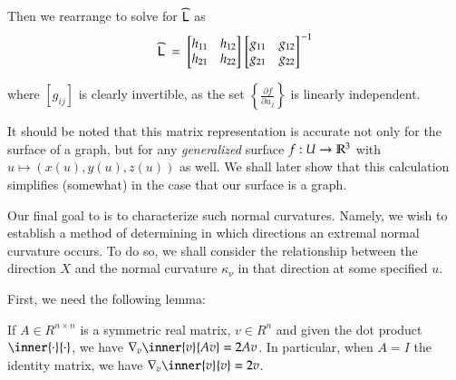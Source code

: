 		Then we rearrange to solve for $\widehat{\mathsf{L}}$ as
			\begin{equation} \label{weinmatconstruction}
			\widehat{\mathsf{L}}
			\;=\; \begin{bmatrix} h_{11} & h_{12} \\ h_{21} & h_{22} \end{bmatrix}
			\left.\begin{bmatrix} g_{11} & g_{12} \\ g_{21} & g_{22} \end{bmatrix}\right.^{-1}
			\end{equation}
		
		where $\left[ g_{ij} \right]$ is clearly invertible, as the set
		$\left\{\frac{\partial f}{\partial u_j}\right\}$ is linearly independent.
		
		It should be noted that this matrix representation is accurate not only for the surface of a graph, but for any \textit{generalized} surface
		$f: U \to \mathbb{R}^3 $ with $u \mapsto (x(u), y(u), z(u))$ as well. We shall later show that this calculation simplifies (somewhat) in the case that our surface is a graph.
		
		
		Our final goal to is to characterize such normal curvatures.
		Namely, we wish to establish a method of determining in which directions an extremal
		normal curvature occurs.
		To do so, we shall consider the relationship between the direction $X$ and the normal curvature $\kappa_\nu$ in that direction at some specified $u$.

	
		
		First, we need the following lemma:
        \begin{lemma}
            If $A\in R^{n\times n}$ is a symmetric real matrix, $v \in R^n$
            and given the dot product $\inner{\cdot}{\cdot}$,
            we have $\nabla_{v} \inner{v}{Av} = 2Av$.
            In particular, when $A = I$ the identity matrix, we have
            $ \nabla_{v} \inner{v}{v} = 2v$.
        \end{lemma}
        

